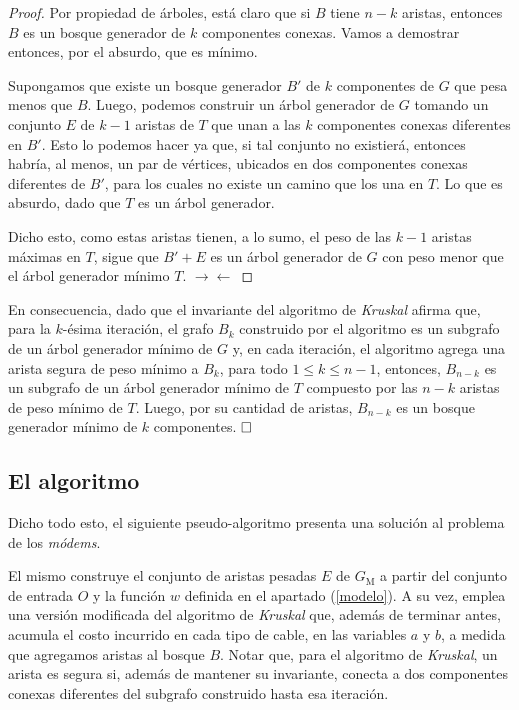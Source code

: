 \begin{proof}
Por propiedad de árboles, está claro que si $B$ tiene $n - k$ aristas, entonces $B$ es un bosque generador de $k$ componentes conexas. Vamos a demostrar entonces, por el absurdo, que es mínimo.

Supongamos que existe un bosque generador $B'$ de $k$ componentes de $G$ que pesa menos que $B$. Luego, podemos construir un árbol generador de $G$ tomando un conjunto $E$ de $k-1$ aristas de $T$ que unan a las $k$ componentes conexas diferentes en $B'$. Esto lo podemos hacer ya que, si tal conjunto no existierá, entonces habría, al menos, un par de vértices, ubicados en dos componentes conexas diferentes de $B'$, para los cuales no existe un camino que los una en $T$. Lo que es absurdo, dado que $T$ es un árbol generador.

Dicho esto, como estas aristas tienen, a lo sumo, el peso de las $k-1$ aristas máximas en $T$, sigue que $B' + E$ es un árbol generador de $G$ con peso menor que el árbol generador mínimo $T$. $\rightarrow\leftarrow$  
\end{proof}
En consecuencia, dado que el invariante del algoritmo de \textit{Kruskal} afirma que, para la $k$-ésima iteración, el grafo $B_k$ construido por el algoritmo es un subgrafo de un árbol generador mínimo de $G$ y, en cada iteración, el algoritmo agrega una arista segura de peso mínimo a $B_k$, para todo $1 \leq k \leq n-1$, entonces, $B_{n-k}$ es un subgrafo de un árbol generador mínimo de $T$ compuesto por las $n-k$ aristas de peso mínimo de $T$. Luego, por su cantidad de aristas, $B_{n-k}$ es un bosque generador mínimo de $k$ componentes. $\hfill \square$

\subsection{El algoritmo} Dicho todo esto, el siguiente pseudo-algoritmo presenta una solución al problema de los \textit{módems}. 



El mismo construye el conjunto de aristas pesadas $E$ de $G_{\text{M}}$ a partir del conjunto de entrada $O$ y la función $w$ definida en el apartado (\ref{modelo}). A su vez, emplea una versión modificada del algoritmo de \textit{Kruskal} que, además de terminar antes, acumula el costo incurrido en cada tipo de cable, en las variables $a$ y $b$, a medida que agregamos aristas al bosque $B$. Notar que, para el algoritmo de \textit{Kruskal}, un arista es segura si, además de mantener su invariante, conecta a dos componentes conexas diferentes del subgrafo construido hasta esa iteración.

